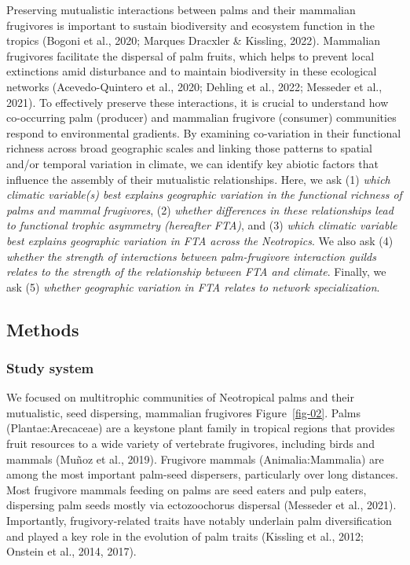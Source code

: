 \documentclass[
]{agujournal2019}
\begin{document}
Preserving mutualistic interactions between palms and their mammalian
frugivores is important to sustain biodiversity and ecosystem function
in the tropics (Bogoni et al., 2020; Marques Dracxler \& Kissling,
2022). Mammalian frugivores facilitate the dispersal of palm fruits,
which helps to prevent local extinctions amid disturbance and to
maintain biodiversity in these ecological networks (Acevedo-Quintero et
al., 2020; Dehling et al., 2022; Messeder et al., 2021). To effectively
preserve these interactions, it is crucial to understand how
co-occurring palm (producer) and mammalian frugivore (consumer)
communities respond to environmental gradients. By examining
co-variation in their functional richness across broad geographic scales
and linking those patterns to spatial and/or temporal variation in
climate, we can identify key abiotic factors that influence the assembly
of their mutualistic relationships. Here, we ask (1) \emph{which
climatic variable(s) best explains geographic variation in the
functional richness of palms and mammal frugivores}, (2) \emph{whether
differences in these relationships lead to functional trophic asymmetry
(hereafter FTA)}, and (3) \emph{which climatic variable best explains
geographic variation in FTA across the Neotropics}. We also ask (4)
\emph{whether the strength of interactions between palm-frugivore
interaction guilds relates to the strength of the relationship between
FTA and climate}. Finally, we ask (5) \emph{whether geographic variation
in FTA relates to network specialization}.

\subsection{Methods}\label{methods}

\subsubsection{Study system}\label{study-system}

We focused on multitrophic communities of Neotropical palms and their
mutualistic, seed dispersing, mammalian frugivores Figure~\ref{fig-02}.
Palms (Plantae:Arecaceae) are a keystone plant family in tropical
regions that provides fruit resources to a wide variety of vertebrate
frugivores, including birds and mammals (Muñoz et al., 2019). Frugivore
mammals (Animalia:Mammalia) are among the most important palm-seed
dispersers, particularly over long distances. Most frugivore mammals
feeding on palms are seed eaters and pulp eaters, dispersing palm seeds
mostly via ectozoochorus dispersal (Messeder et al., 2021). Importantly,
frugivory-related traits have notably underlain palm diversification and
played a key role in the evolution of palm traits (Kissling et al.,
2012; Onstein et al., 2014, 2017).
\end{document}

